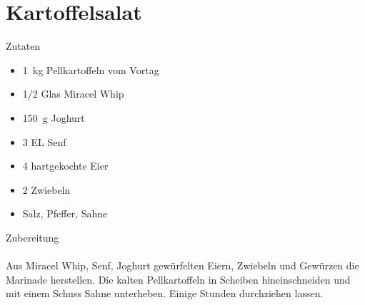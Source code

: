 \section*{Kartoffelsalat}
\ihead{}\ohead{}
\cfoot{}
{\Large Zutaten}
\begin{multicols}{2}
\begin{itemize}
    \item \SI{1}{kg} Pellkartoffeln vom Vortag
    \item \num{1/2} Glas Miracel Whip
    \item \SI{150}{g} Joghurt
    \item \num{3} EL Senf
    \item \num{4} hartgekochte Eier
    \item \num{2} Zwiebeln
    \item Salz, Pfeffer, Sahne
\end{itemize}
\end{multicols}
\noindent
{\Large Zubereitung}\\
\\
Aus Miracel Whip, Senf, Joghurt gewürfelten Eiern, Zwiebeln und Gewürzen die Marinade herstellen.
Die kalten Pellkartoffeln in Scheiben hineinschneiden und mit einem Schuss Sahne unterheben.
Einige Stunden durchziehen lassen.
